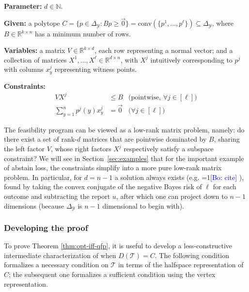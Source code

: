 \documentclass[anon]{colt2020} %
\newcommand{\Comments}{1}
\newcommand{\mynote}[2]{\ifnum\Comments=1\textcolor{#1}{#2}\fi}
\newcommand{\bo}[1]{\mynote{blue}{[Bo: #1]}}
\newcommand{\reals}{\mathbb{R}}
\newcommand{\simplex}{\Delta_\Y}
\newcommand{\T}{\mathcal{T}}
\newcommand{\Y}{\mathcal{Y}}
\newcommand{\conv}{\mathrm{conv}}
\begin{document}
\begin{definition} \label{def:qfp} ~ \\
  \indent \textbf{Parameter:} $d \in \mathbb{N}$.

  \textbf{Given:} a polytope $C = \{p \in \simplex : Bp \geq \vec 0\} = \conv(\{p^1, \ldots, p^\ell\}) \subseteq \simplex$, where $B \in \reals^{k \times n}$ has a minimum number of rows.

  \textbf{Variables:} a matrix $V \in \reals^{k \times d}$, each row representing a normal vector; and a collection of matrices $X^1,\ldots,X^{\ell} \in \reals^{d \times n}$, with $X^j$ intuitively corresponding to $p^j$ with columns $x^j_y$ representing witness points.

  \textbf{Constraints:}
    \begin{align}
      V X^j                     &\leq B    & \text{(pointwise, $\forall j \in [\ell]$)}  \label{eqn:qp-constr-1} \\
      \sum_{y=1}^n p^j(y) x^j_y &= \vec 0  & \text{($\forall j \in [\ell]$)}    \label{eqn:qp-constr-2}
    \end{align}
\end{definition}

The feasibility program can be viewed as a low-rank matrix problem, namely: do there exist a set of rank-$d$ matrices that are pointwise dominated by $B$, sharing the left factor $V$, whose right factors $X^j$ respectively satisfy a subspace constraint?
We will see in Section~\ref{sec:examples} that for the important example of abstain loss, the constraints simplify into a more pure low-rank matrix problem.
In particular, for $d=n-1$ a solution always exists (e.g. \bo{cite} \cite[Theorem 2]{finocchiaro2019embedding}), found by taking the convex conjugate of the negative Bayes risk of $\ell$ for each outcome and subtracting the report $u$, after which one can project down to $n-1$ dimensions (because $\simplex$ is $n-1$ dimensional to begin with).

\subsubsection{Developing the proof}

To prove Theorem \ref{thm:opt-iff-qfp}, it is useful to develop a less-constructive intermediate characterization of when $D(\T) = C$.
The following condition formalizes a necessary condition on $\T$ in terms of the halfspace representation of $C$; the subsequent one formalizes a sufficient condition using the vertex representation.
\end{document}
